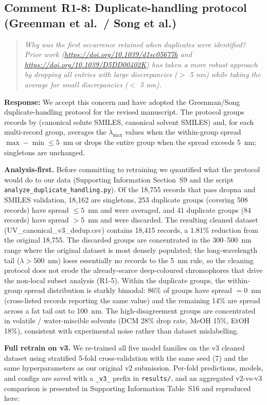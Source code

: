 \documentclass[11pt]{article}
\newenvironment{reviewer}{%
  \begin{quote}\itshape\color{black!70}}{%
  \end{quote}}
\newcommand{\response}[1]{\noindent\textbf{Response:} #1\par\medskip}
\begin{document}
\subsection*{Comment R1-8: Duplicate-handling protocol (Greenman et al.\ / Song et al.)}
\begin{reviewer}
Why was the first occurrence retained when duplicates were identified? Prior work (\url{https://doi.org/10.1039/d1sc05677h} and \url{https://doi.org/10.1039/D5DD00402K}) has taken a more robust approach by dropping all entries with large discrepancies ($>$ 5 nm) while taking the average for small discrepancies ($<$ 5 nm).
\end{reviewer}

\response{We accept this concern and have adopted the Greenman/Song duplicate-handling protocol for the revised manuscript. The protocol groups records by (canonical solute SMILES, canonical solvent SMILES) and, for each multi-record group, averages the $\lambda_{\max}$ values when the within-group spread $\max - \min \leq 5$~nm or drops the entire group when the spread exceeds 5~nm; singletons are unchanged.

\textbf{Analysis-first.} Before committing to retraining we quantified what the protocol would do to our data (Supporting Information Section~S9 and the script \texttt{analyze\_duplicate\_handling.py}). Of the 18{,}755 records that pass dropna and SMILES validation, 18{,}162 are singletons, 253 duplicate groups (covering 508 records) have spread $\leq 5$~nm and were averaged, and 41 duplicate groups (84 records) have spread $> 5$~nm and were discarded. The resulting cleaned dataset (UV\_canonical\_v3\_dedup.csv) contains 18{,}415 records, a 1.81\% reduction from the original 18{,}755. The discarded groups are concentrated in the 300--500~nm range where the original dataset is most densely populated; the long-wavelength tail ($\lambda > 500$~nm) loses essentially no records to the 5~nm rule, so the cleaning protocol does not erode the already-scarce deep-coloured chromophores that drive the non-local subset analysis (R1-5). Within the duplicate groups, the within-group spread distribution is starkly bimodal: 86\% of groups have spread $= 0$~nm (cross-listed records reporting the same value) and the remaining 14\% are spread across a fat tail out to 100~nm. The high-disagreement groups are concentrated in volatile / water-miscible solvents (DCM 28\% drop rate, MeOH 15\%, EtOH 18\%), consistent with experimental noise rather than dataset mislabelling.

\textbf{Full retrain on v3.} We re-trained all five model families on the v3 cleaned dataset using stratified 5-fold cross-validation with the same seed (7) and the same hyperparameters as our original v2 submission. Per-fold predictions, models, and configs are saved with a \texttt{\_v3\_} prefix in \texttt{results/}, and an aggregated v2-vs-v3 comparison is presented in Supporting Information Table~S16 and reproduced here:

}
\end{document}
